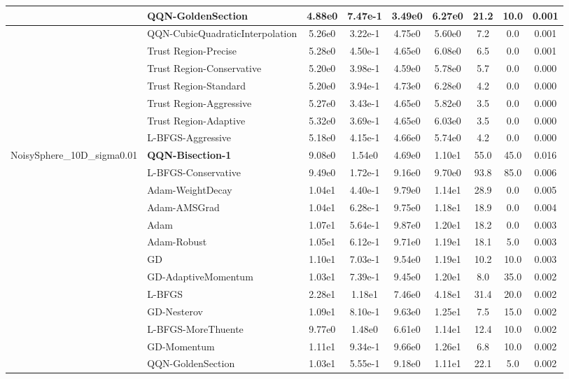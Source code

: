 \documentclass{article}
\begin{document}
\begin{longtable}{|l|l|c|c|c|c|c|c|c|}
\hline
 & QQN-GoldenSection & 4.88e0 & 7.47e-1 & 3.49e0 & 6.27e0 & 21.2 & 10.0 & 0.001 \\
\hline
 & QQN-CubicQuadraticInterpolation & 5.26e0 & 3.22e-1 & 4.75e0 & 5.60e0 & 7.2 & 0.0 & 0.001 \\
\hline
 & Trust Region-Precise & 5.28e0 & 4.50e-1 & 4.65e0 & 6.08e0 & 6.5 & 0.0 & 0.001 \\
\hline
 & Trust Region-Conservative & 5.20e0 & 3.98e-1 & 4.59e0 & 5.78e0 & 5.7 & 0.0 & 0.000 \\
\hline
 & Trust Region-Standard & 5.20e0 & 3.94e-1 & 4.73e0 & 6.28e0 & 4.2 & 0.0 & 0.000 \\
\hline
 & Trust Region-Aggressive & 5.27e0 & 3.43e-1 & 4.65e0 & 5.82e0 & 3.5 & 0.0 & 0.000 \\
\hline
 & Trust Region-Adaptive & 5.32e0 & 3.69e-1 & 4.65e0 & 6.03e0 & 3.5 & 0.0 & 0.000 \\
\hline
 & L-BFGS-Aggressive & 5.18e0 & 4.15e-1 & 4.66e0 & 5.74e0 & 4.2 & 0.0 & 0.000 \\
NoisySphere\_10D\_sigma0.01 & \textbf{QQN-Bisection-1} & 9.08e0 & 1.54e0 & 4.69e0 & 1.10e1 & 55.0 & 45.0 & 0.016 \\
\hline
 & L-BFGS-Conservative & 9.49e0 & 1.72e-1 & 9.16e0 & 9.70e0 & 93.8 & 85.0 & 0.006 \\
\hline
 & Adam-WeightDecay & 1.04e1 & 4.40e-1 & 9.79e0 & 1.14e1 & 28.9 & 0.0 & 0.005 \\
\hline
 & Adam-AMSGrad & 1.04e1 & 6.28e-1 & 9.75e0 & 1.18e1 & 18.9 & 0.0 & 0.004 \\
\hline
 & Adam & 1.07e1 & 5.64e-1 & 9.87e0 & 1.20e1 & 18.2 & 0.0 & 0.003 \\
\hline
 & Adam-Robust & 1.05e1 & 6.12e-1 & 9.71e0 & 1.19e1 & 18.1 & 5.0 & 0.003 \\
\hline
 & GD & 1.10e1 & 7.03e-1 & 9.54e0 & 1.19e1 & 10.2 & 10.0 & 0.003 \\
\hline
 & GD-AdaptiveMomentum & 1.03e1 & 7.39e-1 & 9.45e0 & 1.20e1 & 8.0 & 35.0 & 0.002 \\
\hline
 & L-BFGS & 2.28e1 & 1.18e1 & 7.46e0 & 4.18e1 & 31.4 & 20.0 & 0.002 \\
\hline
 & GD-Nesterov & 1.09e1 & 8.10e-1 & 9.63e0 & 1.25e1 & 7.5 & 15.0 & 0.002 \\
\hline
 & L-BFGS-MoreThuente & 9.77e0 & 1.48e0 & 6.61e0 & 1.14e1 & 12.4 & 10.0 & 0.002 \\
\hline
 & GD-Momentum & 1.11e1 & 9.34e-1 & 9.66e0 & 1.26e1 & 6.8 & 10.0 & 0.002 \\
\hline
 & QQN-GoldenSection & 1.03e1 & 5.55e-1 & 9.18e0 & 1.11e1 & 22.1 & 5.0 & 0.002 \\

\end{longtable}
\end{document}
